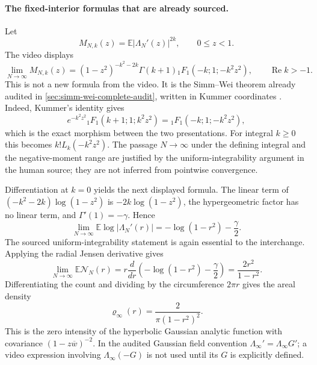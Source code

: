 \paragraph{The fixed-interior formulas that are already sourced.}
Let
\[
 M_{N,k}(z)=\mathbb E|\Lambda_N'(z)|^{2k},
 \qquad 0\leq z<1.
\]
The video displays
\begin{equation}
 \lim_{N\to\infty}M_{N,k}(z)
 =(1-z^2)^{-k^2-2k}\Gamma(k+1)
 {}_1F_1(-k;1;-k^2z^2),
 \qquad \operatorname{Re}k>-1.
 \label{eq:video-SW-Kummer-form}
\end{equation}
This is not a new formula from the video.  It is the Simm--Wei theorem already audited in
\cref{sec:simm-wei-complete-audit}, written in Kummer coordinates
\cite[Thm.~1.1]{simmWei2026}.  Indeed, Kummer's identity gives
\[
 e^{-k^2z^2}{}_1F_1(k+1;1;k^2z^2)
 ={}_1F_1(-k;1;-k^2z^2),
\]
which is the exact morphism between the two presentations.  For integral $k\geq0$ this
becomes $k!L_k(-k^2z^2)$.  The passage $N\to\infty$ under the defining integral and the
negative-moment range are justified by the uniform-integrability argument in the human
source; they are not inferred from pointwise convergence.

Differentiation at $k=0$ yields the next displayed formula.  The linear term of
$(-k^2-2k)\log(1-z^2)$ is $-2k\log(1-z^2)$, the hypergeometric factor has no linear term,
and $\Gamma'(1)=-\gamma$.  Hence
\begin{equation}
 \lim_{N\to\infty}\mathbb E\log|\Lambda_N'(r)|
 =-\log(1-r^2)-\frac{\gamma}{2}.
 \label{eq:video-log-moment-sourced}
\end{equation}
The sourced uniform-integrability statement is again essential to the interchange.
Applying the radial Jensen derivative gives
\begin{equation}
 \lim_{N\to\infty}\mathbb E\mathcal N_N(r)
 =r\frac{d}{dr}\left(-\log(1-r^2)-\frac{\gamma}{2}\right)
 =\frac{2r^2}{1-r^2}.
 \label{eq:video-expected-count-sourced}
\end{equation}
Differentiating the count and dividing by the circumference $2\pi r$ gives the areal
density
\begin{equation}
 \varrho_\infty(r)=\frac{2}{\pi(1-r^2)^2}.
 \label{eq:video-hyperbolic-density}
\end{equation}
This is the zero intensity of the hyperbolic Gaussian analytic function with covariance
$(1-z\overline w)^{-2}$.  In the audited Gaussian field convention
$\Lambda_\infty'=\Lambda_\infty G'$; a video expression involving
$\Lambda_\infty(-G)$ is not used until its $G$ is explicitly defined.

